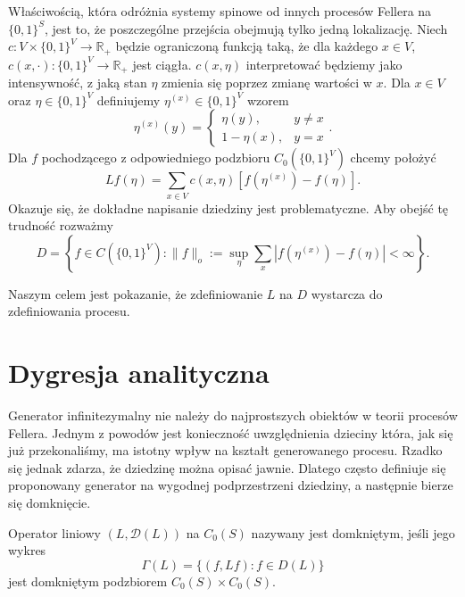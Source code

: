 \documentclass{article}
\begin{document}
Właściwością, która odróżnia systemy spinowe od innych procesów Fellera na $\{0,1\}^S$, 
jest to, że poszczególne przejścia obejmują tylko jedną lokalizację. 
Niech $c \colon V \times \{0,1\}^V \to \mathbb{R}_+$ będzie ograniczoną 
funkcją taką, że dla każdego $x \in V$, $c(x, \cdot) \colon \{0,1\}^V \to \mathbb{R}_+$ jest
ciągła. $c(x,\eta)$ interpretować będziemy jako intensywność, z jaką stan $\eta$ zmienia się poprzez
zmianę wartości w $x$. Dla $x \in V$ oraz $\eta \in \{0,1\}^V$ definiujemy $\eta^{(x)} \in \{0,1\}^V$
wzorem
\begin{equation*}
	\eta^{(x)}(y) = \left\{ 
	\begin{array}{cc} \eta(y), & y \neq x \\ 1-\eta(x), & y=x \end{array}\right..
\end{equation*}
Dla $f$ pochodzącego z odpowiedniego podzbioru  $C_0(\{0,1\}^V)$ chcemy
położyć
\begin{equation}\label{eq:4:defL}
	Lf(\eta) = \sum_{x\in V} c(x, \eta)\left[f\left(\eta^{(x)}\right) - f(\eta)\right].
\end{equation}
Okazuje się, że dokładne napisanie dziedziny jest problematyczne. Aby obejść tę trudność 
rozważmy
\begin{equation}\label{eq:4:defD}
	D = \left\{ f \in C(\{0,1\}^V) : \|f\|_o := \sup_{\eta} \sum_x \left|f\left(\eta^{(x)}\right) - f(\eta)\right| < \infty \right\}.
\end{equation}

Naszym celem jest pokazanie, że zdefiniowanie $L$ na $D$ wystarcza do zdefiniowania procesu.

\section{Dygresja analityczna}

	Generator infinitezymalny nie należy do najprostszych obiektów w teorii procesów Fellera.
	Jednym z powodów jest konieczność uwzględnienia dzieciny która, jak się już przekonaliśmy,
	ma istotny wpływ na kształt generowanego procesu.
	Rzadko się jednak zdarza, że dziedzinę można opisać jawnie.
	Dlatego często definiuje się proponowany generator na wygodnej
	podprzestrzeni dziedziny, a następnie bierze się domknięcie.

	\begin{defn}
		Operator liniowy $(L, \mathcal{D}(L))$ na \( C_0(S) \)
		nazywany jest domkniętym, jeśli jego wykres
		\[
			\Gamma(L)=\{(f, Lf) : f \in D(L)\}
		\]
		jest domkniętym podzbiorem \( C_0(S) \times C_0(S) \).
	\end{defn}
\end{document}
